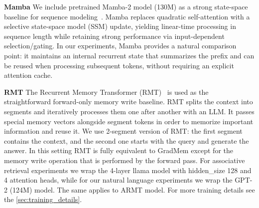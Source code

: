 \documentclass{article}
\theoremstyle{plain}
\theoremstyle{definition}
\theoremstyle{remark}
\begin{document}
{\textbf{Mamba}
We include pretrained Mamba-2 model (130M) as a strong state-space baseline for sequence modeling~\citep{dao2024transformersssmsgeneralizedmodels}.
Mamba replaces quadratic self-attention with a selective state-space model (SSM) update, yielding linear-time processing in sequence length while retaining strong performance via input-dependent selection/gating.
In our experiments, Mamba provides a natural comparison point: it maintains an internal recurrent state that summarizes the prefix and can be reused when processing subsequent tokens, without requiring an explicit attention cache.

\textbf{RMT}
The Recurrent Memory Transformer (RMT)~\citep{rmt_2022} is used as the straightforward forward-only memory write baseline. RMT splits the context into segments and iteratively processes them one after another with an LLM. It passes special memory vectors alongside segment tokens in order to memorize important information and reuse it. We use 2-segment version of RMT: the first segment contains the context, and the second one starts with the query and generate the answer. In this setting RMT is fully equivalent to GradMem except for the memory write operation that is performed by the forward pass. For associative retrieval experiments we wrap the 4-layer llama model with hidden\_size 128 and 4 attention heads, while for our natural language experiments we wrap the GPT-2 (124M) model. The same applies to ARMT model. For more training details see the \autoref{sec:training_details}.

}
\end{document}
